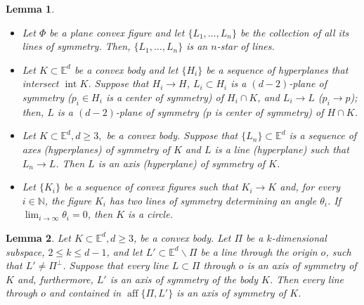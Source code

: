 \documentclass[10pt,a4paper]{amsart}
\newtheorem{lemma}{Lemma}
\newcommand{\Ed}{\mathbb{E}^{d}}
\newcommand{\aff}{\operatorname*{aff}}
\newcommand{\inte}{\operatorname*{int}}
\begin{document}
\begin{lemma}\label{contento}


\begin{itemize}

$~$

\item[I.] Let $\Phi$ be a plane convex figure and let   $\{L_1,\ldots, L_n \}$ be the collection of all its lines 
of symmetry. Then,  $\{L_1,\ldots,L_n \}$ is an $n$-star of lines.
 
\item[II.] Let $K \subset \Ed$ be a convex body and let $\{H_i \}$ be a sequence of hyperplanes that intersect $\inte K$. Suppose that $H_i \rightarrow H$, $L_i \subset H_i$ is a $(d-2)$-plane of symmetry ($p_i \in H_i$ is a center of symmetry) of $H_i \cap K$, and $L_i \rightarrow  L$ ($p_i \rightarrow  p$); then, $L$ is a $(d-2)$-plane of symmetry ($p$ is center of symmetry) of $H \cap K$. 

\item[III.] Let $K\subset \Ed, d\geq3,$ be a convex body. Suppose that $\{L_n\} \subset \Ed$ is a sequence of axes (hyperplanes) of symmetry of $K$ and $L$ is a line (hyperplane) such that $L_n \rightarrow L$. Then $L$ is an axis (hyperplane) of symmetry of $K$.

\item[IV.] Let $\{K_i\}$ be a sequence of convex figures such that  $K_i \rightarrow K$ and, for every $i\in\mathbb{N}$, the figure $K_i$ has two lines of symmetry determining an angle $\theta_i$. If 
$\lim_{i\to\infty}\theta_i=0$, then  $K$ is a circle.
\end{itemize}

\end{lemma}

\begin{lemma}\label{kiara} 
Let $K\subset \Ed, d\geq 3$, be a convex body. Let $\Pi$ be a $k$-dimensional subspace, $2\leq k\leq d-1$, and let $L'\subset \Ed \backslash \Pi$ be a line through the origin $o$, such that  $L'\not=\Pi^{\perp}$. 
Suppose that every line $L\subset \Pi$ through $o$ is an axis of symmetry of $K$ and, furthermore, $L'$ is an axis of symmetry of the body $K$. Then every line through $o$ and contained in $\aff\{\Pi, L'\}$ is an axis of symmetry of $K$.
\end{lemma}
\end{document}
